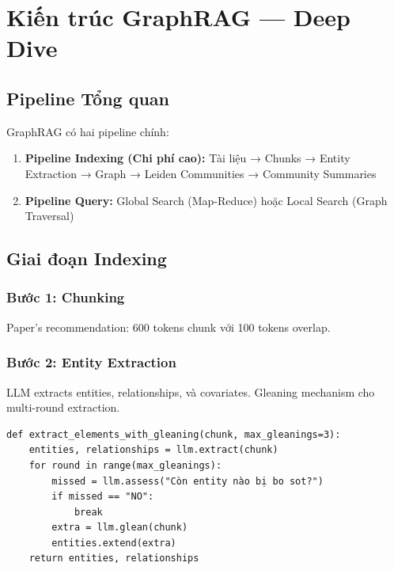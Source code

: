 \documentclass[conference]{IEEEtran}
\begin{document}
\section{Kiến trúc GraphRAG --- Deep Dive}

\subsection{Pipeline Tổng quan}

GraphRAG có hai pipeline chính:
\begin{enumerate}
    \item \textbf{Pipeline Indexing (Chi phí cao):} Tài liệu → Chunks → Entity Extraction → Graph → Leiden Communities → Community Summaries
    \item \textbf{Pipeline Query:} Global Search (Map-Reduce) hoặc Local Search (Graph Traversal)
\end{enumerate}

\subsection{Giai đoạn Indexing}

\subsubsection{Bước 1: Chunking}

Paper's recommendation: 600 tokens chunk với 100 tokens overlap.

\subsubsection{Bước 2: Entity Extraction}

LLM extracts entities, relationships, và covariates. Gleaning mechanism cho multi-round extraction.

\begin{lstlisting}[caption={Entity Extraction với Gleaning}]
def extract_elements_with_gleaning(chunk, max_gleanings=3):
    entities, relationships = llm.extract(chunk)
    for round in range(max_gleanings):
        missed = llm.assess("Còn entity nào bị bo sot?")
        if missed == "NO":
            break
        extra = llm.glean(chunk)
        entities.extend(extra)
    return entities, relationships
\end{lstlisting}
\end{document}
